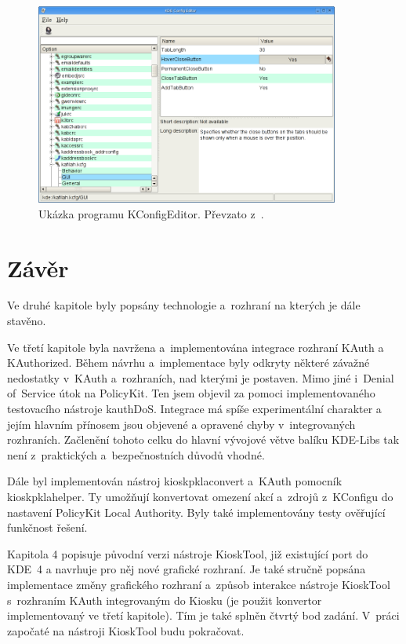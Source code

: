 \begin{figure}[h]
    \centering
    \includegraphics[width=10cm]{obrazky/kconfigeditor1.png}
    \caption{Ukázka programu KConfigEditor. Převzato z~\cite{KConfigEditor}.}
    \label{fig:kconfeditor}
\end{figure}


\chapter{Závěr}
Ve druhé kapitole byly popsány technologie a~rozhraní na kterých je dále stavěno.

Ve třetí kapitole byla navržena a~implementována integrace rozhraní KAuth a KAuthorized. Během návrhu a~implementace byly odkryty některé závažné nedostatky v~KAuth a~rozhraních, nad kterými je postaven. Mimo jiné i~Denial of~Service útok na PolicyKit. Ten jsem objevil za pomoci implementovaného testovacího nástroje kauthDoS. Integrace má spíše experimentální charakter a jejím hlavním přínosem jsou objevené a opravené chyby v~integrovaných rozhraních. Začlenění tohoto celku do hlavní vývojové větve balíku KDE-Libs tak není z~praktických a~bezpečnostních důvodů vhodné.

Dále byl implementován nástroj kioskpklaconvert a~KAuth pomocník kioskpklahelper. Ty umožňují konvertovat omezení akcí a~zdrojů z~KConfigu do nastavení PolicyKit Local Authority. Byly také implementovány testy ověřující funkčnost řešení.

Kapitola 4 popisuje původní verzi nástroje KioskTool, již existující port do KDE~4 a navrhuje pro něj nové grafické rozhraní. Je také stručně popsána implementace změny grafického rozhraní a~způsob interakce nástroje KioskTool s~rozhraním KAuth integrovaným do Kiosku (je použit konvertor implementovaný ve třetí kapitole). Tím je také splněn čtvrtý bod zadání. V~práci započaté na nástroji KioskTool budu pokračovat.

